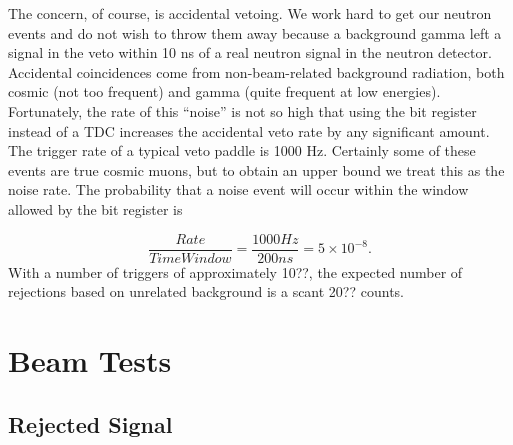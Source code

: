 The concern, of course, is accidental vetoing.  We work hard to get our neutron events and do not wish to throw them away because a background gamma left a signal in the veto within 10 ns of a real neutron signal in the neutron detector.  Accidental coincidences come from non-beam-related background radiation, both cosmic (not too frequent) and gamma (quite frequent at low energies).  Fortunately, the rate of this ``noise'' is not so high that using the bit register instead of a TDC increases the accidental veto rate by any significant amount.  The trigger rate of a typical veto paddle is 1000 Hz.  Certainly some of these events are true cosmic muons, but to obtain an upper bound we treat this as the noise rate.  The probability that a noise event will occur within the window allowed by the bit register is 

\begin{equation}
\frac{Rate}{Time Window} = \frac{1000 Hz}{200 ns} = 5\times10^{-8}.
\end{equation}
With a number of triggers of approximately 10??, the expected number of rejections based on unrelated background is a scant 20?? counts.

\section{Beam Tests}

\subsection{Rejected Signal}

%
% 
% 
